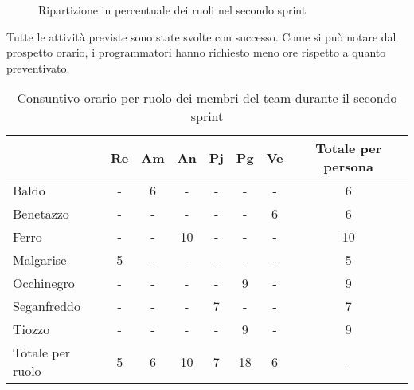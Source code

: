 \begin{figure}[!h]
    \centering
    \caption{Ripartizione in percentuale dei ruoli nel secondo sprint}
    \label{fig:6}
\end{figure}

\newpage
{}
Tutte le attività previste sono state svolte con successo. Come si può notare dal prospetto orario, i programmatori hanno richiesto meno ore rispetto a quanto preventivato.

\begin{table}[!h]
    \centering
    \begin{tabular}{ | l | c | c | c | c | c | c | c | }
        \hline
        \textbf{} & \textbf{Re} & \textbf{Am} &\textbf{An} & \textbf{Pj} & \textbf{Pg} & \textbf{Ve} & \textbf{Totale per persona} \\
        \hline
        Baldo            &  -   &  6   &  -   &  -   &  -   &  -   &  6   \\
        Benetazzo        &  -   &  -   &  -   &  -   &  -   &  6   &  6   \\
        Ferro            &  -   &  -   & 10   &  -   &  -   &  -   & 10   \\
        Malgarise        &  5   &  -   &  -   &  -   &  -   &  -   &  5   \\
        Occhinegro       &  -   &  -   &  -   &  -   &  9   &  -   &  9   \\
        Seganfreddo      &  -   &  -   &  -   &  7   &  -   &  -   &  7   \\
        Tiozzo           &  -   &  -   &  -   &  -   &  9   &  -   &  9   \\
        \hline
        Totale per ruolo &  5   &  6   & 10   &  7   & 18   &  6   &  -   \\
        \hline
    \end{tabular}
    \caption{Consuntivo orario per ruolo dei membri del team durante il secondo sprint}
    \label{tab:18}
\end{table}

